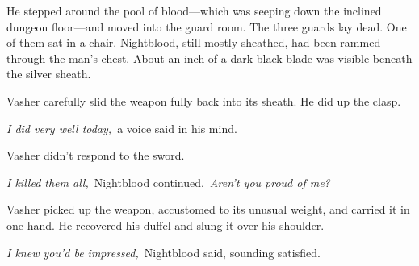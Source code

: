 He stepped around the pool of blood—which was seeping down the inclined dungeon floor—and moved into the guard room. The three guards lay dead. One of them sat in a chair. Nightblood, still mostly sheathed, had been rammed through the man’s chest. About an inch of a dark black blade was visible beneath the silver sheath.

Vasher carefully slid the weapon fully back into its sheath. He did up the clasp.

\textit{I did very well today,}~a voice said in his mind.

Vasher didn’t respond to the sword.

\textit{I killed them all,}~Nightblood continued.~\textit{Aren’t you proud of me?}

Vasher picked up the weapon, accustomed to its unusual weight, and carried it in one hand. He recovered his duffel and slung it over his shoulder.

\textit{I knew you’d be impressed,}~Nightblood said, sounding satisfied.

